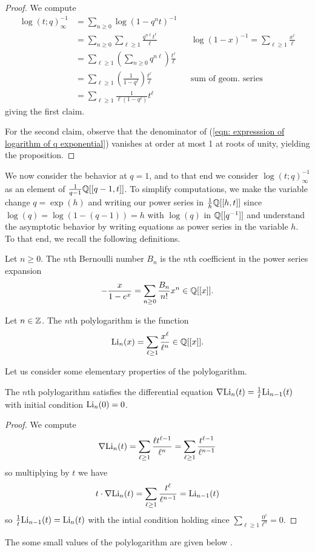 \begin{proof}
    We compute 
    \begin{align*}
        \log(t;q)_{\infty}^{-1} &= \sum_{n\geq0}\log(1-q^{n}t)^{-1} \\
        &= \sum_{n\geq0}\sum_{\ell\geq1}\frac{q^{n\ell}t^{\ell}}{\ell}&& \log(1-x)^{-1}=\sum_{\ell\geq1}\frac{x^{\ell}}{\ell} \\
        &= \sum_{\ell\geq1}\left(\sum_{n\geq0}q^{n\ell}\right)\frac{t^{\ell}}{\ell} \\
        &= \sum_{\ell\geq1}\left(\frac{1}{1-q^{\ell}}\right)\frac{t^{\ell}}{\ell} && \text{sum of geom. series} \\
        &= \sum_{\ell\geq1}\frac{1}{\ell(1-q^{\ell})}t^{\ell}
    \end{align*}
    giving the first claim. 

    For the second claim, observe that the denominator of (\ref{eqn: expresssion of logarithm of q exponential}) vanishes at order at most 1 at roots of unity, yielding the proposition. 
\end{proof}
We now consider the behavior at $q=1$, and to that end we consider $\log(t;q)_{\infty}^{-1}$ as an element of $\frac{1}{q-1}\mathbb{Q}[[q-1,t]]$. To simplify computations, we make the variable change $q=\exp(h)$ and writing our power series in $\frac{1}{h}\mathbb{Q}[[h,t]]$ since $\log(q)=\log(1-(q-1))=h$ with $\log(q)$ in $\mathbb{Q}[[q^{-1}]]$ and understand the asymptotic behavior by writing equations as power series in the variable $h$. To that end, we recall the following definitions. 
\begin{definition}\label{def: Bernoulli number}
    Let $n\geq0$. The $n$th Bernoulli number $B_{n}$ is the $n$th coefficient in the power series expansion 
    $$-\frac{x}{1-e^{x}}=\sum_{n\geq0}\frac{B_{n}}{n!}x^{n}\in\mathbb{Q}[[x]].$$
\end{definition}
\begin{definition}[Polylogarithm]\label{def: polylogarithm}
    Let $n\in\mathbb{Z}$. The $n$th polylogarithm is the function
    $$\mathrm{Li}_{n}(x)=\sum_{\ell\geq1}\frac{x^{\ell}}{\ell^{n}}\in\mathbb{Q}[[x]].$$
\end{definition}
Let us consider some elementary properties of the polylogarithm. 
\begin{lemma}\label{lem: polylogarithm differential equation}
    The $n$th polylogarithm satisfies the differential equation $\nabla\mathrm{Li}_{n}(t)=\frac{1}{t}\mathrm{Li}_{n-1}(t)$ with initial condition $\mathrm{Li}_{n}(0)=0$. 
\end{lemma}
\begin{proof}
    We compute
    $$ \nabla\mathrm{Li}_{n}(t)=\sum_{\ell\geq1}\frac{\ell t^{\ell-1}}{\ell^{n}}=\sum_{\ell\geq1}\frac{t^{\ell-1}}{\ell^{n-1}}$$
    so multiplying by $t$ we have 
    $$t\cdot\nabla\mathrm{Li}_{n}(t)=\sum_{\ell\geq 1}\frac{t^{\ell}}{\ell^{n-1}}= \mathrm{Li}_{n-1}(t)$$
    so $\frac{1}{t}\mathrm{Li}_{n-1}(t)=\mathrm{Li}_{n}(t)$ with the intial condition holding since $\sum_{\ell\geq1}\frac{0^{\ell}}{\ell^{n}}=0$. 
\end{proof}
The some small values of the polylogarithm are given below \cite{Polylogarithm}. 

